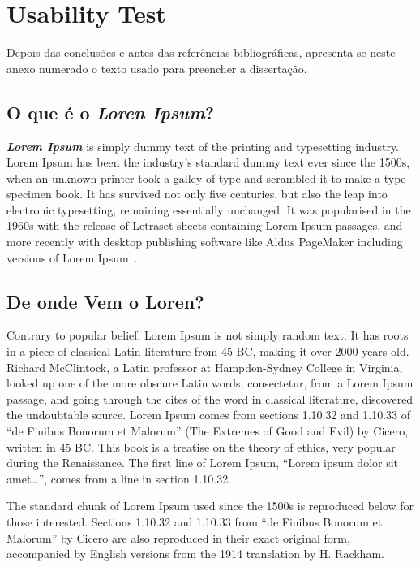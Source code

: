 \chapter{Usability Test} \label{ap2:usabtest}

Depois das conclusões e antes das referências bibliográficas,
apresenta-se neste anexo numerado o texto usado para preencher a
dissertação.

\section{O que é o \emph{Loren Ipsum}?}

\emph{\textbf{Lorem Ipsum}} is simply dummy text of the printing and
typesetting industry. Lorem Ipsum has been the industry's standard
dummy text ever since the 1500s, when an unknown printer took a galley
of type and scrambled it to make a type specimen book. It has survived
not only five centuries, but also the leap into electronic
typesetting, remaining essentially unchanged. It was popularised in
the 1960s with the release of Letraset sheets containing Lorem Ipsum
passages, and more recently with desktop publishing software like
Aldus PageMaker including versions of Lorem Ipsum~\citep{kn:Lip08}. 

\section{De onde Vem o Loren?}

Contrary to popular belief, Lorem Ipsum is not simply random text. It
has roots in a piece of classical Latin literature from 45 BC, making
it over 2000 years old. Richard McClintock, a Latin professor at
Hampden-Sydney College in Virginia, looked up one of the more obscure
Latin words, consectetur, from a Lorem Ipsum passage, and going
through the cites of the word in classical literature, discovered the
undoubtable source. Lorem Ipsum comes from sections 1.10.32 and
1.10.33 of ``de Finibus Bonorum et Malorum'' (The Extremes of Good and
Evil) by Cicero, written in 45 BC. This book is a treatise on the
theory of ethics, very popular during the Renaissance. The first line
of Lorem Ipsum, ``Lorem ipsum dolor sit amet\ldots'', comes from a line in
section 1.10.32.

The standard chunk of Lorem Ipsum used since the 1500s is reproduced
below for those interested. Sections 1.10.32 and 1.10.33 from ``de
Finibus Bonorum et Malorum'' by Cicero are also reproduced in their
exact original form, accompanied by English versions from the 1914
translation by H. Rackham.

